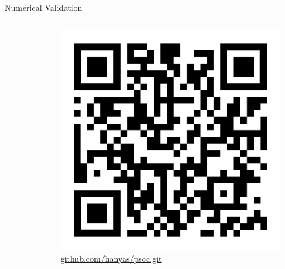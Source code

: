 \documentclass[10pt, aspectratio=1610]{beamer}
\begin{document}
    \begin{frame}{Numerical Validation}
      \begin{columns}
        \begin{column}{0.5\textwidth}
          \begin{figure}[htbp]
            \centering
            
          \end{figure}
        \end{column}
        \begin{column}{0.5\textwidth}
          \begin{figure}[htbp]
            \centering
            \includegraphics[scale=0.1]{figures/psoc_qr.png}
            \caption{\url{github.com/hanyas/psoc.git}}
          \end{figure}
        \end{column}
      \end{columns}
    \end{frame}
\end{document}
